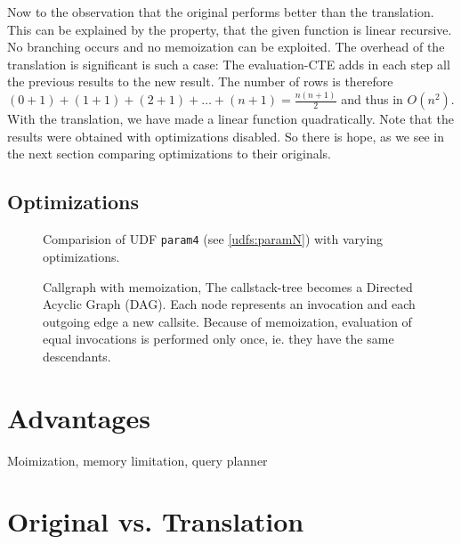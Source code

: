 Now to the observation that the original performs better than the translation. This can be explained by the property, that the given function is linear recursive. No branching occurs and no memoization can be exploited. The overhead of the translation is significant is such a case: The evaluation-CTE adds in each step all the previous results to the new result. The number of rows is therefore $(0 + 1) + (1 + 1) + (2 + 1) + \dots + (n + 1) = \frac{n(n+1)}{2}$ and thus in $O(n^2)$. With the translation, we have made a linear function quadratically. Note that the results were obtained with optimizations disabled. So there is hope, as we see in the next section comparing optimizations to their originals.

\subsection{Optimizations}

\begin{figure}[h]
    \centering
    
    \caption{Comparision of UDF \texttt{param4} (see \autoref{udfs:paramN}) with varying optimizations.}
    \label{fig:paramN}
\end{figure}



\begin{figure}
    \centering
    
    \caption{Callgraph with memoization, The callstack-tree becomes a Directed Acyclic Graph (DAG). Each node represents an invocation and each outgoing edge a new callsite. Because of memoization, evaluation of equal invocations is performed only once, ie. they have the same descendants.}
    \label{fig:fib_callstack_memoization}
\end{figure}


\section{Advantages} Moimization, memory limitation, query planner
\section{Original vs. Translation}

